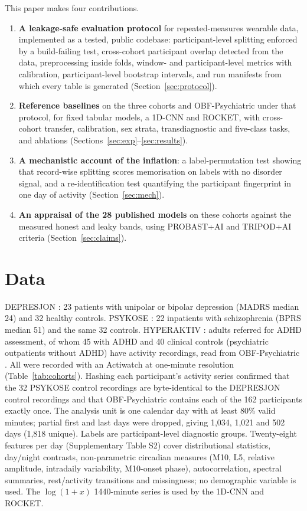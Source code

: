 \documentclass[journal]{IEEEtran}
\newcommand{\wideon}{\renewenvironment{table}[1][]{\begin{table}[!t]}{\end{table}}}
\newcommand{\wideoff}{\renewenvironment{table}[1][]{\begin{origtable}[!t]}{\end{origtable}}}
\begin{document}
This paper makes four contributions.
\begin{enumerate}[nosep,leftmargin=*]
\item \textbf{A leakage-safe evaluation protocol} for repeated-measures wearable data, implemented as a tested, public codebase: participant-level splitting enforced by a build-failing test, cross-cohort participant overlap detected from the data, preprocessing inside folds, window- and participant-level metrics with calibration, participant-level bootstrap intervals, and run manifests from which every table is generated (Section~\ref{sec:protocol}).
\item \textbf{Reference baselines} on the three cohorts and OBF-Psychiatric under that protocol, for fixed tabular models, a 1D-CNN and ROCKET, with cross-cohort transfer, calibration, sex strata, transdiagnostic and five-class tasks, and ablations (Sections~\ref{sec:exp}--\ref{sec:results}).
\item \textbf{A mechanistic account of the inflation}: a label-permutation test showing that record-wise splitting scores memorisation on labels with no disorder signal, and a re-identification test quantifying the participant fingerprint in one day of activity (Section~\ref{sec:mech}).
\item \textbf{An appraisal of the 28 published models} on these cohorts against the measured honest and leaky bands, using PROBAST+AI and TRIPOD+AI criteria (Section~\ref{sec:claims}).
\end{enumerate}

\section{Data}\label{sec:data}
\wideon\wideoff
DEPRESJON \cite{garciaceja2018}: 23 patients with unipolar or bipolar depression (MADRS median 24) and 32 healthy controls. PSYKOSE \cite{jakobsen2020}: 22 inpatients with schizophrenia (BPRS median 51) and the same 32 controls. HYPERAKTIV \cite{hicks2021}: adults referred for ADHD assessment, of whom 45 with ADHD and 40 clinical controls (psychiatric outpatients without ADHD) have activity recordings, read from OBF-Psychiatric \cite{obf2025}. All were recorded with an Actiwatch at one-minute resolution (Table~\ref{tab:cohorts}). Hashing each participant's activity series confirmed that the 32 PSYKOSE control recordings are byte-identical to the DEPRESJON control recordings and that OBF-Psychiatric contains each of the 162 participants exactly once. The analysis unit is one calendar day with at least 80\% valid minutes; partial first and last days were dropped, giving 1{,}034, 1{,}021 and 502 days (1{,}818 unique). Labels are participant-level diagnostic groups. Twenty-eight features per day (Supplementary Table S2) cover distributional statistics, day/night contrasts, non-parametric circadian measures (M10, L5, relative amplitude, intradaily variability, M10-onset phase), autocorrelation, spectral summaries, rest/activity transitions and missingness; no demographic variable is used. The $\log(1+x)$ 1440-minute series is used by the 1D-CNN and ROCKET.
\end{document}
